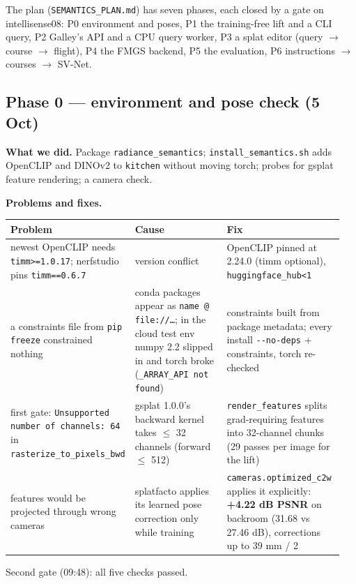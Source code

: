 \documentclass[11pt,a4paper]{article}
\newcommand{\code}[1]{\texttt{#1}}
\begin{document}
The plan (\code{SEMANTICS\_\allowbreak{}PLAN.md}) has seven phases, each closed by a gate on intellisense08: P0 environment and poses, P1 the training-free lift and a CLI query, P2 Galley's API and a CPU query worker, P3 a splat editor (query $\rightarrow$ course $\rightarrow$ flight), P4 the FMGS backend, P5 the evaluation, P6 instructions $\rightarrow$ courses $\rightarrow$ SV-Net.

\subsection{Phase 0 — environment and pose check (5 Oct)}
\textbf{What we did.} Package \code{radiance\_\allowbreak{}semantics}; \code{install\_\allowbreak{}semantics.sh} adds OpenCLIP and DINOv2 to \code{kitchen} without moving torch; probes for gsplat feature rendering; a camera check.

\textbf{Problems and fixes.}

\begin{center}\small
\begin{tabular}{@{}>{\raggedright\arraybackslash}p{0.221\linewidth}>{\raggedright\arraybackslash}p{0.365\linewidth}>{\raggedright\arraybackslash}p{0.362\linewidth}@{}}
\toprule
\textbf{Problem} & \textbf{Cause} & \textbf{Fix} \\
\midrule
newest OpenCLIP needs \code{timm>=1.0.17}; nerfstudio pins \code{timm==0.6.7} & version conflict & OpenCLIP pinned at 2.24.0 (timm optional), \code{huggingface\_\allowbreak{}hub<1} \\
a constraints file from \code{pip freeze} constrained nothing & conda packages appear as \code{name @ file:/\allowbreak{}/\allowbreak{}…}; in the cloud test env numpy 2.2 slipped in and torch broke (\code{\_\allowbreak{}ARRAY\_\allowbreak{}API not found}) & constraints built from package metadata; every install \code{-{}-no-deps} + constraints, torch re-checked \\
first gate: \code{Unsupported number of channels: 64} in \code{rasterize\_\allowbreak{}to\_\allowbreak{}pixels\_\allowbreak{}bwd} & gsplat 1.0.0's backward kernel takes $\le$ 32 channels (forward $\le$ 512) & \code{render\_\allowbreak{}features} splits grad-requiring features into 32-channel chunks (29 passes per image for the lift) \\
features would be projected through wrong cameras & splatfacto applies its learned pose correction only while training & \code{cameras.optimized\_\allowbreak{}c2w} applies it explicitly: \textbf{+4.22 dB PSNR} on backroom (31.68 vs 27.46 dB), corrections up to 39 mm / 2\textdegree{} \\
\bottomrule
\end{tabular}
\end{center}
Second gate (09:48): all five checks passed.
\end{document}
